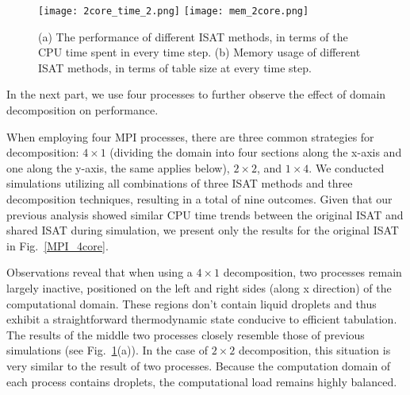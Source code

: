
\begin{figure}[htbp]
    \centering
\texttt{[image: 2core\_time\_2.png]} 
\texttt{[image: mem\_2core.png]} 
\caption{(a) The performance of different ISAT methods, in terms of the CPU time spent in every time step. (b) Memory usage of different ISAT methods, in terms of table size at every time step.}\label{MPI_2core} 
\end{figure}

In the next part, we use four processes to further observe the effect of domain decomposition on performance.


When employing four MPI processes, there are three common strategies for decomposition: $4\times1$ (dividing the domain into four sections along the x-axis and one along the y-axis, the same applies below), $2\times2$, and $1\times4$. We conducted simulations utilizing all combinations of three ISAT methods and three decomposition techniques, resulting in a total of nine outcomes. Given that our previous analysis showed similar CPU time trends between the original ISAT and shared ISAT during simulation, we present only the results for the original ISAT in Fig.~\ref{MPI_4core}.

Observations reveal that when using a $4\times1$ decomposition, two processes remain largely inactive, positioned on the left and right sides (along x direction) of the computational domain. These regions don't contain liquid droplets and thus exhibit a straightforward thermodynamic state conducive to efficient tabulation. The results of the middle two processes closely resemble those of previous simulations (see Fig.~\ref{MPI_2core}(a)). In the case of $2\times2$ decomposition, this situation is very similar to the result of two processes. Because the computation domain of each process contains droplets, the computational load remains highly balanced.


